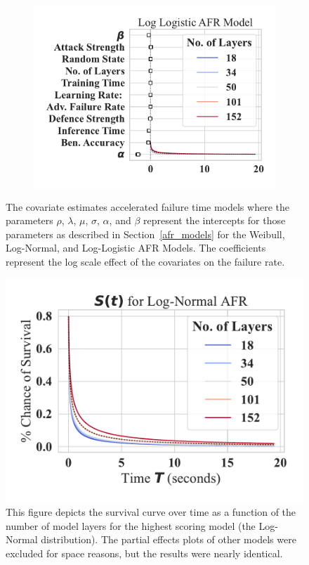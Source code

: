 \begin{figure}[h!]
\begin{subfigure}[t]{0.3\textwidth}
        \includegraphics[width=\textwidth]{mnist/log_logistic_aft.pdf}
    \end{subfigure}
    
    \caption{The covariate estimates accelerated failure time models where the parameters $\rho$, $\lambda$, $\mu$, $\sigma$, $\alpha$, and $\beta$ represent the intercepts for those parameters as described in Section~\ref{afr_models} for the Weibull, Log-Normal, and Log-Logistic AFR Models. The coefficients represent the log scale effect of the covariates on the failure rate.}
    \label{fig:mnist_afr_models}
\end{figure}

\begin{figure}[h!]

    \centering\includegraphics[width=.5\textwidth]{mnist/log_normal_partial_effects.pdf}
   \caption{This figure depicts the survival curve over time as a function of the number of model layers for the highest scoring model (the Log-Normal distribution). The partial effects plots of other models were excluded for space reasons, but the results were nearly identical.}
    \label{fig:mnist_mnist_layers}
\end{figure}


